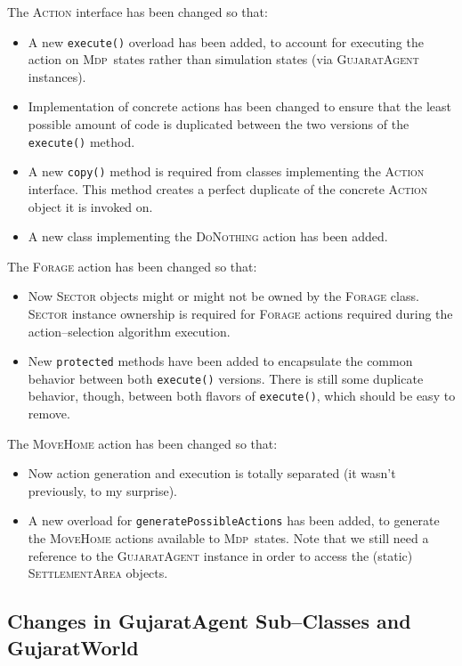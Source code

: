 \documentclass[a4paper,10pt]{article}
\newcommand{\mdp}{\textsc{Mdp}}
\begin{document}
The \textsc{Action} interface has been changed so that:
\begin{itemize}
\item A new \texttt{execute()} overload has been added, to account for executing the action on \mdp~states rather
than simulation states (via \textsc{GujaratAgent} instances).
\item Implementation of concrete actions has been changed to ensure that the least possible amount of code is
duplicated between the two versions of the \texttt{execute()} method.
\item A new \texttt{copy()} method is required from classes implementing the \textsc{Action} interface. This method
creates a perfect duplicate of the concrete \textsc{Action} object it is invoked on.
\item A new class implementing the \textsc{DoNothing} action has been added.
\end{itemize}

The \textsc{Forage} action has been changed so that:
\begin{itemize}
\item Now \textsc{Sector} objects might or might not be owned by the \textsc{Forage} class. \textsc{Sector} instance
ownership is required for \textsc{Forage} actions required during the action--selection algorithm execution.
\item New \texttt{protected} methods have been added to encapsulate the common behavior between both \texttt{execute()}
versions. There is still some duplicate behavior, though, between both flavors of \texttt{execute()}, which should
be easy to remove.
\end{itemize}

The \textsc{MoveHome} action has been changed so that:
\begin{itemize}
\item Now action generation and execution is totally separated (it wasn't previously, to my surprise).
\item A new overload for \texttt{generatePossibleActions} has been added, to generate the \textsc{MoveHome} actions
available to \mdp~states. Note that we still need a reference to the \textsc{GujaratAgent} instance in order to
access the (static) \textsc{SettlementArea} objects.
\end{itemize}

\subsection{Changes in GujaratAgent Sub--Classes and GujaratWorld}
\end{document}

